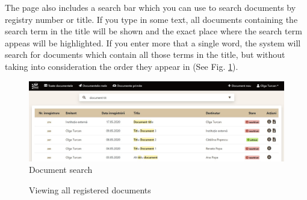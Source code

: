 The page also includes a search bar which you can use to search documents by registry number or title. If you type in some text, all documents containing the search term in the title will be shown and the exact place where the search term appeas will be highlighted. If you enter more that a single word, the system will search for documents which contain all those terms in the title, but without taking into consideration the order they appear in (See Fig. \ref{searchInline}).

\begin{figure}[H]
    \centering
    \includegraphics[width=5in]{images/app/search_inline_mix}
    \caption{Document search}
    \label{searchInline}
\end{figure}

\begin{figure}[ht]
    \centering
    \qquad
    \caption{Viewing all registered documents}
    \label{documentsTable}
\end{figure}

